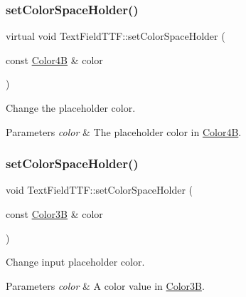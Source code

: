 \subsubsection{\texorpdfstring{set\+Color\+Space\+Holder()}{setColorSpaceHolder()}\hspace{0.1cm}{\footnotesize\ttfamily [2/4]}}
{\footnotesize\ttfamily virtual void Text\+Field\+T\+T\+F\+::set\+Color\+Space\+Holder (\begin{DoxyParamCaption}\item[{const \hyperlink{structColor4B}{Color4B} \&}]{color }\end{DoxyParamCaption})\hspace{0.3cm}{\ttfamily [virtual]}}

Change the placeholder color. 
\begin{DoxyParams}{Parameters}
{\em color} & The placeholder color in \hyperlink{structColor4B}{Color4B}. \\
\hline
\end{DoxyParams}
\mbox{\label{classTextFieldTTF_a4a44970abe58917d7c09775a50e5e06d}} 
\subsubsection{\texorpdfstring{set\+Color\+Space\+Holder()}{setColorSpaceHolder()}\hspace{0.1cm}{\footnotesize\ttfamily [3/4]}}
{\footnotesize\ttfamily void Text\+Field\+T\+T\+F\+::set\+Color\+Space\+Holder (\begin{DoxyParamCaption}\item[{const \hyperlink{structColor3B}{Color3B} \&}]{color }\end{DoxyParamCaption})\hspace{0.3cm}{\ttfamily [virtual]}}



Change input placeholder color. 


\begin{DoxyParams}{Parameters}
{\em color} & A color value in {\ttfamily \hyperlink{structColor3B}{Color3B}}. \\
\hline
\end{DoxyParams}
\mbox{\label{classTextFieldTTF_a6f376d7c8856c2263d5eb2ef247359dd}} 
